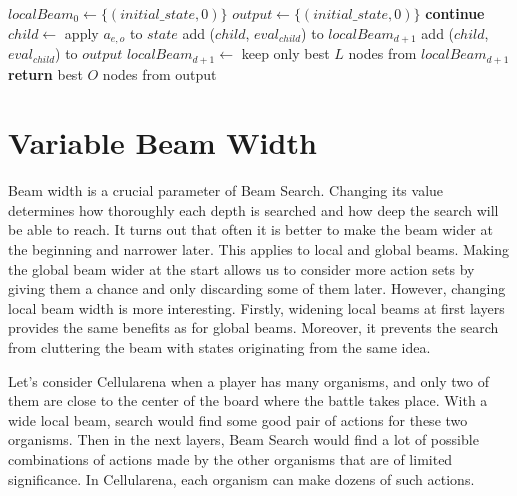 \documentclass[shortabstract, mgr, english]{iithesis}
\begin{document}
\begin{algorithm}[h]
\caption{Local Beam Search with Output}
\label{alg:LocalBeamSearchOutput}
\begin{algorithmic} [1]  
    \State $localBeam_0 \gets \{(initial\_state, 0)\}$ 
    \State $output \gets \{(initial\_state, 0)\}$
                    \State \textbf{continue}
                \EndIf
                    \State $child \gets$ apply $a_{e,o}$ to $state$
                    \State add ($child$, $eval_{child}$) to $localBeam_{d+1}$
                    \State add ($child$, $eval_{child}$) to $output$
                \EndFor
            \EndFor
                \State $localBeam_{d+1} \gets$ keep only best $L$ nodes from $localBeam_{d+1}$
            \EndIf
        \EndFor
    \EndFor
    \State {}
    \State \textbf{return} best $O$ nodes from output
\EndProcedure
\end{algorithmic}
\end{algorithm}

\section{Variable Beam Width}
\label{sec:VariableBeamWidth}
Beam width is a crucial parameter of Beam Search. Changing its value determines how thoroughly each depth is searched and how deep the search will be able to reach. It turns out that often it is better to make the beam wider at the beginning and narrower later. This applies to local and global beams. Making the global beam wider at the start allows us to consider more action sets by giving them a chance and only discarding some of them later. However, changing local beam width is more interesting. Firstly, widening local beams at first layers provides the same benefits as for global beams. Moreover, it prevents the search from cluttering the beam with states originating from the same idea.

Let's consider Cellularena when a player has many organisms, and only two of them are close to the center of the board where the battle takes place. With a wide local beam, search would find some good pair of actions for these two organisms. Then in the next layers, Beam Search would find a lot of possible combinations of actions made by the other organisms that are of limited significance. In Cellularena, each organism can make dozens of such actions. 
\end{document}
